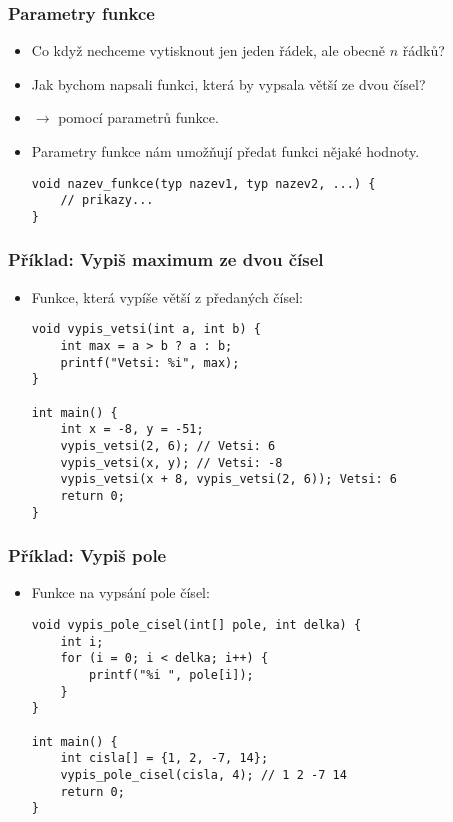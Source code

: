 \documentclass{beamer}
\newenvironment{itemizex}%
  {\large \begin{itemize}%
    \setlength{\itemsep}{8pt}%
    \setlength{\parskip}{8pt}}%
  {\end{itemize}}
\begin{document}
\begin{frame}[t,fragile]\frametitle{Parametry funkce} 
    \begin{itemizex}
        \item Co když nechceme vytisknout jen jeden řádek, ale obecně $n$ řádků?
        \item Jak bychom napsali funkci, která by vypsala větší ze dvou čísel? 
        \item $\longrightarrow$ pomocí parametrů funkce.
        \item Parametry funkce nám umožňují předat funkci nějaké hodnoty.
        \begin{verbatim} 
void nazev_funkce(typ nazev1, typ nazev2, ...) { 
    // prikazy... 
}
        \end{verbatim}
    \end{itemizex}
\end{frame}



\begin{frame}[t,fragile]\frametitle{Příklad: Vypiš maximum ze dvou čísel} 
    \begin{itemizex}
        \item Funkce, která vypíše větší z předaných čísel:
        \begin{verbatim} 
void vypis_vetsi(int a, int b) {
    int max = a > b ? a : b;
    printf("Vetsi: %i", max);
}

int main() {
    int x = -8, y = -51;
    vypis_vetsi(2, 6); // Vetsi: 6
    vypis_vetsi(x, y); // Vetsi: -8
    vypis_vetsi(x + 8, vypis_vetsi(2, 6)); Vetsi: 6
    return 0;
}
        \end{verbatim}
    \end{itemizex}
\end{frame}


\begin{frame}[t,fragile]\frametitle{Příklad: Vypiš pole} 
    \begin{itemizex}
        \item Funkce na vypsání pole čísel:
        \begin{verbatim} 
void vypis_pole_cisel(int[] pole, int delka) {
    int i;
    for (i = 0; i < delka; i++) {
        printf("%i ", pole[i]);
    }
}

int main() {
    int cisla[] = {1, 2, -7, 14};
    vypis_pole_cisel(cisla, 4); // 1 2 -7 14 
    return 0;
}
        \end{verbatim}
    \end{itemizex}
\end{frame}
\end{document}
